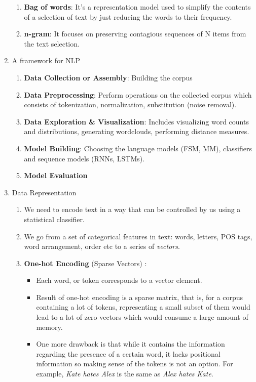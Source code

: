 \documentclass[11pt]{article}
\begin{document}
\begin{enumerate}
\begin{enumerate}
\item \textbf{Bag of words}: It's a representation model used to simplify the contents of a selection of text by just reducing the words to their frequency.
\item \textbf{n-gram}: It focuses on preserving contagious sequences of N items from the text selection.
\end{enumerate}
\item A framework for NLP
\label{sec:org70ac094}
\begin{enumerate}
\item \textbf{Data Collection or Assembly}: Building the corpus
\item \textbf{Data Preprocessing}: Perform operations on the collected corpus which consists of tokenization, normalization, substitution (noise removal).
\item \textbf{Data Exploration \& Visualization}: Includes visualizing word counts and distributions, generating wordclouds, performing distance measures.
\item \textbf{Model Building}: Choosing the language models (FSM, MM), classifiers and sequence models (RNNs, LSTMs).
\item \textbf{Model Evaluation}
\end{enumerate}
\item Data Representation
\label{sec:org3f034a5}
\begin{enumerate}
\item We need to encode text in a way that can be controlled by us using a statistical classifier.
\item We go from a set of categorical features in text: words, letters, POS tags, word arrangement, order etc to a series of \emph{vectors}.
\item \textbf{One-hot Encoding} (Sparse Vectors) :
\begin{itemize}
\item Each word, or token corresponds to a vector element.
\item Result of one-hot encoding is a sparse matrix, that is, for a corpus containing a lot of tokens, representing a small subset of them would lead to a lot of zero vectors which would consume a large amount of memory.
\item One more drawback is that while it contains the information regarding the presence of a certain word, it lacks positional information so making sense of the tokens is not an option. For example, \emph{Kate hates Alex} is the same as \emph{Alex hates Kate}.

\end{itemize}
\end{enumerate}
\end{enumerate}
\end{document}
